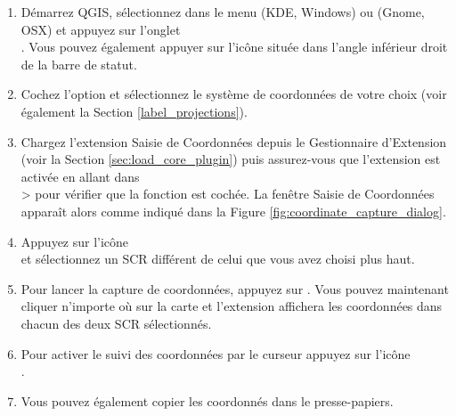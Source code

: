 \begin{enumerate}
  \item Démarrez QGIS, sélectionnez  dans le menu 
   (KDE, Windows) ou  (Gnome, OSX) 
  et appuyez sur l'onglet\\ .
  Vous pouvez également appuyer sur l'icône 
  située dans l'angle inférieur droit de la barre de statut.
  \item Cochez l'option  et
  sélectionnez le système de coordonnées de votre choix (voir également
  la Section \ref{label_projections}).
  \item Chargez l'extension Saisie de Coordonnées depuis le Gestionnaire
  d'Extension (voir la Section \ref{sec:load_core_plugin}) puis assurez-vous
  que l'extension est activée en allant dans\\  >  
  pour vérifier que la fonction  est cochée. 
   La fenêtre Saisie de Coordonnées apparaît alors comme indiqué dans 
  la Figure \ref{fig:coordinate_capture_dialog}.
  \item Appuyez sur l'icône\\  
  et sélectionnez un SCR différent de celui que vous avez choisi plus haut.
  \item Pour lancer la capture de coordonnées, appuyez sur . Vous pouvez maintenant cliquer n'importe où sur la carte et l'extension affichera les coordonnées dans chacun des deux SCR sélectionnés.
  \item Pour activer le suivi des coordonnées par le curseur appuyez sur l'icône\\ .
  \item Vous pouvez également copier les coordonnés dans le presse-papiers.
\end{enumerate}